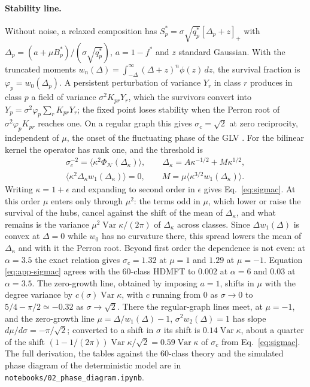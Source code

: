 \documentclass[pre,twocolumn,superscriptaddress,nofootinbib]{revtex4-2}
\newcommand{\Var}{\operatorname{Var}}
\newcommand{\PhiN}{\Phi_{\mathcal N}}
\begin{document}
\paragraph{Stability line.}  Without noise, a relaxed composition has $S_p^*=\sigma\sqrt{q_p^*}
[\Delta_p+z]_+$ with $\Delta_p=(a+\mu B_p^*)/(\sigma\sqrt{q_p^*})$, $a=1-f^*$ and $z$ standard Gaussian.  With the
truncated moments $w_n(\Delta)=\int_{-\Delta}^\infty(\Delta+z)^n\phi(z)\,dz$, the survival fraction is
$\varphi_p=w_0(\Delta_p)$.  A persistent perturbation of variance $Y_r$ in class $r$ produces in class $p$ a
field of variance $\sigma^2K_{pr}Y_r$, which the survivors convert into $Y_p=\sigma^2\varphi_p\sum_rK_{pr}Y_r$; the
fixed point loses stability when the Perron root of $\sigma^2\varphi_pK_{pr}$ reaches one.  On a regular graph
this gives $\sigma_c=\sqrt2$ at zero reciprocity, independent of $\mu$, the onset of the fluctuating
phase of the GLV \cite{roy2020,mallmin2024}.  For the bilinear kernel the operator has rank one, and
the threshold is
\begin{gather}
\sigma_c^{-2}=\big\langle\kappa^2\PhiN(\Delta_\kappa)\big\rangle,\qquad \Delta_\kappa=A\kappa^{-1/2}+M\kappa^{1/2},\nonumber\\
\big\langle\kappa^2\Delta_\kappa w_1(\Delta_\kappa)\big\rangle=0,\qquad M=\mu\big\langle\kappa^{3/2}w_1(\Delta_\kappa)\big\rangle .
\label{eq:app-sigmac}
\end{gather}
Writing $\kappa=1+\epsilon$ and expanding to second order in $\epsilon$ gives Eq.~\eqref{eq:sigmac}.  At this
order $\mu$ enters only through $\mu^2$: the terms odd in $\mu$, which lower or raise the survival of the hubs,
cancel against the shift of the mean of $\Delta_\kappa$, and what remains is the variance $\mu^2\Var\kappa/(2\pi)$ of
$\Delta_\kappa$ across classes.  Since $\Delta w_1(\Delta)$ is convex at $\Delta=0$ while $w_0$ has no curvature there,
this spread lowers the mean of $\Delta_\kappa$ and with it the Perron root.  Beyond first order the dependence is
not even: at $\alpha=3.5$ the exact relation gives $\sigma_c=1.32$ at $\mu=1$ and $1.29$ at $\mu=-1$.  Equation
\eqref{eq:app-sigmac} agrees with the 60-class HDMFT to $0.002$ at $\alpha=6$ and $0.03$ at $\alpha=3.5$.  The
zero-growth line, obtained by imposing $a=1$, shifts in $\mu$ with the degree variance by $c(\sigma)\Var\kappa$, with
$c$ running from $0$ as $\sigma\to0$ to $5/4-\pi/2\simeq-0.32$ as $\sigma\to\sqrt2$.  There the regular-graph lines meet, at
$\mu=-1$, and the zero-growth line $\mu=\Delta/w_1(\Delta)-1$, $\sigma^2w_2(\Delta)=1$ has slope $d\mu/d\sigma=-\pi/\sqrt2$; converted to a
shift in $\sigma$ its shift is $0.14\Var\kappa$, about a quarter of the shift $(1-1/(2\pi))\Var\kappa/\sqrt2=0.59\Var\kappa$
of $\sigma_c$ from Eq.~\eqref{eq:sigmac}.  The full
derivation, the tables against the 60-class theory and the simulated phase diagram of the
deterministic model are in \texttt{notebooks/02\_phase\_diagram.ipynb}.
\end{document}
